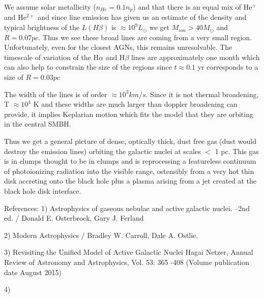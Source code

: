 \documentclass[12pt]{article}   	%
\begin{document}
	We assume solar metallicity ($n_{He} = 0.1 n_{p}$) and that there is an equal mix of He$^{+}$ and He$^{2+}$ and since line emission has given us an estimate of the density and typical brightness of the $L(H\beta)$ is $\approx 10^{9} L_{\odot}$ we get $M_{ion} > 40 M_{\odot}$  and $R = 0.07 pc$. Thus we see these broad lines are coming from a very small region. Unfortunately, even for the closest AGNs, this remains unresolvable. The timescale of variation of the H$\alpha$ and H$\beta$ lines are approximately one month which can also help to constrain the size of the regions since $t \approx 0.1$ yr corresponds to a size of $R = 0.03 pc$
	
	The width of the lines is of order $ \approx 10^{3} km / s $. Since it is not thermal broadening, T $\approx 10^{4}$ K and these widths are much larger than doppler broadening can provide, it implies Keplarian motion which fits the model that they are orbiting in the central SMBH.




Thus we get a general picture of dense, optically thick, dust free gas (dust would destroy the emission lines) orbiting the galactic nuclei at scales $<$ 1 pc. This gas is in clumps thought to be in clumps and is reprocessing a featureless continuum of photoionizing radiation into the visible range, ostensibly from a very hot thin disk accreting onto the black hole plus a plasma arising from a jet created at the black hole disk interface.  



References:
1) Astrophysics of gaseous nebulae and active galactic nuclei. --2nd ed. / 
Donald E. Osterbrock, Gary J. Ferland 

2) Modern Astrophysics / Bradley W. Carroll, Dale A. Ostlie.

3) Revisiting the Unified Model of Active Galactic Nuclei
Hagai Netzer, Annual Review of Astronomy and Astrophysics, 
Vol. 53: 365 -408 (Volume publication date August 2015)

4) 
\end{document}
